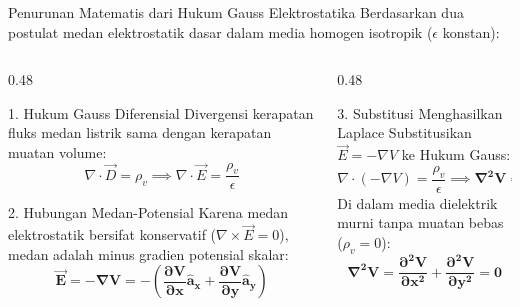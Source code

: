 \documentclass[aspectratio=169,10pt]{beamer}
\begin{document}
\begin{frame}{Penurunan Matematis dari Hukum Gauss Elektrostatika}
  Berdasarkan dua postulat medan elektrostatik dasar dalam media homogen isotropik ($\epsilon$ konstan):
  \vspace{0.1cm}
  \begin{columns}[t]
    \begin{column}{0.48\textwidth}
      \begin{block}{1. Hukum Gauss Diferensial}
        \small
        Divergensi kerapatan fluks medan listrik sama dengan kerapatan muatan volume:
        \begin{equation*}
          \nabla \cdot \vec{D} = \rho_v \implies \nabla \cdot \vec{E} = \frac{\rho_v}{\epsilon}
        \end{equation*}
      \end{block}
      \begin{alertblock}{2. Hubungan Medan-Potensial}
        \small
        Karena medan elektrostatik bersifat konservatif ($\nabla \times \vec{E} = 0$), medan adalah minus gradien potensial skalar:
        \begin{equation*}
          \mathbf{\vec{E} = -\nabla V = -\left( \frac{\partial V}{\partial x}\hat{a}_x + \frac{\partial V}{\partial y}\hat{a}_y \right)}
        \end{equation*}
      \end{alertblock}
    \end{column}
    \begin{column}{0.48\textwidth}
      \begin{exampleblock}{3. Substitusi Menghasilkan Laplace}
        \small
        Substitusikan $\vec{E} = -\nabla V$ ke Hukum Gauss:
        \begin{equation*}
          \nabla \cdot (-\nabla V) = \frac{\rho_v}{\epsilon} \implies \mathbf{\nabla^2 V = -\frac{\rho_v}{\epsilon}}
        \end{equation*}
        Di dalam media dielektrik murni tanpa muatan bebas ($\rho_v = 0$):
        \begin{equation*}
          \mathbf{\nabla^2 V = \frac{\partial^2 V}{\partial x^2} + \frac{\partial^2 V}{\partial y^2} = 0}
        \end{equation*}
      \end{exampleblock}
    \end{column}
  \end{columns}
\end{frame}
\end{document}
